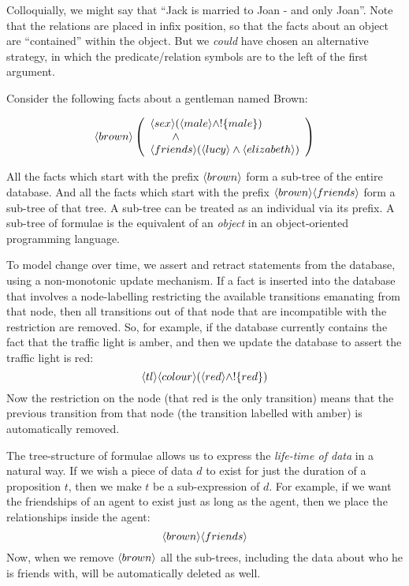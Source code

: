 \NI Colloquially, we might say that ``Jack is
married to Joan - and only Joan''.  Note that the  relations are
placed in infix position,  so that the facts about an object are
``contained'' within the object.   But we \emph{could}
have chosen an alternative strategy, in which the predicate/relation
symbols are to the left of the first argument.
 
Consider the following facts about a gentleman named Brown:

\[
   \langle brown \rangle \left(
   \begin{array}{l}
     \langle sex \rangle (\langle male \rangle \land ! \{male\}) \\
        \qquad \land \\
     \langle friends \rangle (\langle lucy \rangle \land \langle elizabeth \rangle ) 
   \end{array}
   \right)
\]

\NI All the facts which start with the prefix $\MAY{brown}$ form a
sub-tree of the entire database.  And all the facts which start with
the prefix $\MAY{brown} \MAY{friends}$ form a sub-tree of that tree.
A sub-tree can be treated as an individual via its prefix.  
A sub-tree of formulae is the \cathoristic{} equivalent of an
\emph{object} in an object-oriented programming language.

To model change over time, we assert and retract statements from the database, using a non-monotonic update mechanism.
If a fact is inserted into the database that involves a node-labelling restricting the available transitions emanating from that node, then all transitions out of that node that are incompatible with the restriction are removed.
So, for example, if the database currently contains the fact that the traffic light is amber, and then we update the database to assert the traffic light is red:
\[
\langle tl \rangle \langle colour \rangle (\langle red \rangle \land !\{red\})
\]
Now the restriction on the node (that red is the only transition) means that the previous transition from that node (the transition labelled with amber) is automatically removed.

The tree-structure of formulae allows us to express the \emph{life-time of data} in a natural way. 
If we wish a piece of data $d$ to exist for just the duration of a proposition $t$, then we make $t$ be a sub-expression of $d$. 
For example, if we want the friendships of an agent to exist just as long as the agent, then we place the relationships inside the agent: 
\[
\langle brown \rangle \langle friends \rangle \]
Now, when we remove $\MAY{brown}$ all the sub-trees, including the data about who he is friends with, will be automatically deleted as well.

